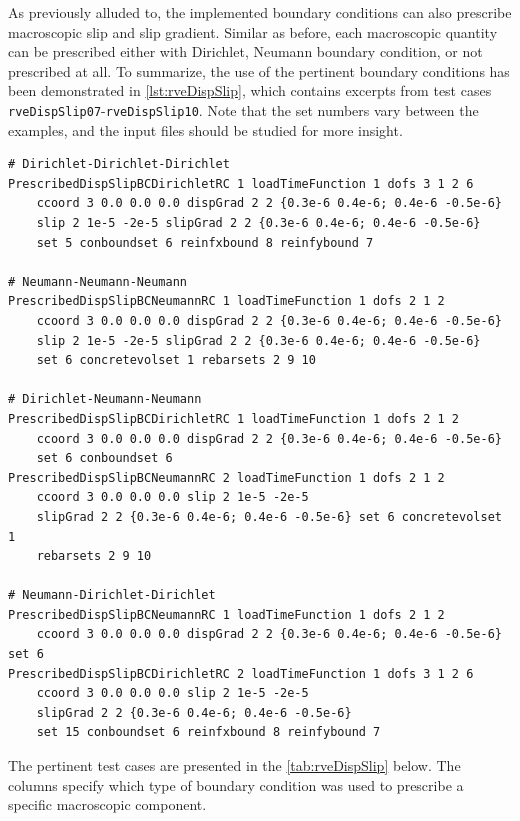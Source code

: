 \documentclass[11pt]{article}
\begin{document}
As previously alluded to, the implemented boundary conditions can also prescribe macroscopic slip and slip gradient. 
Similar as before, each macroscopic quantity can be prescribed either with Dirichlet, Neumann boundary condition, or not prescribed at all. 
To summarize, the use of the pertinent boundary conditions has been demonstrated in \cref{lst:rveDispSlip}, which contains excerpts from test cases \texttt{rveDispSlip07}-\texttt{rveDispSlip10}. Note that the set numbers vary between the examples, and the input files should be studied for more insight.

\begin{minipage}{\linewidth}
\begin{lstlisting}[style=oofem,language=oofeminput, caption={Use of boundary condition for prescribing macroscopic strain, slip and slip gradient.}, label=lst:rveDispSlip]
# Dirichlet-Dirichlet-Dirichlet
PrescribedDispSlipBCDirichletRC 1 loadTimeFunction 1 dofs 3 1 2 6 
    ccoord 3 0.0 0.0 0.0 dispGrad 2 2 {0.3e-6 0.4e-6; 0.4e-6 -0.5e-6} 
    slip 2 1e-5 -2e-5 slipGrad 2 2 {0.3e-6 0.4e-6; 0.4e-6 -0.5e-6} 
    set 5 conboundset 6 reinfxbound 8 reinfybound 7

# Neumann-Neumann-Neumann
PrescribedDispSlipBCNeumannRC 1 loadTimeFunction 1 dofs 2 1 2 
    ccoord 3 0.0 0.0 0.0 dispGrad 2 2 {0.3e-6 0.4e-6; 0.4e-6 -0.5e-6} 
    slip 2 1e-5 -2e-5 slipGrad 2 2 {0.3e-6 0.4e-6; 0.4e-6 -0.5e-6} 
    set 6 concretevolset 1 rebarsets 2 9 10

# Dirichlet-Neumann-Neumann
PrescribedDispSlipBCDirichletRC 1 loadTimeFunction 1 dofs 2 1 2 
    ccoord 3 0.0 0.0 0.0 dispGrad 2 2 {0.3e-6 0.4e-6; 0.4e-6 -0.5e-6} 
    set 6 conboundset 6
PrescribedDispSlipBCNeumannRC 2 loadTimeFunction 1 dofs 2 1 2 
    ccoord 3 0.0 0.0 0.0 slip 2 1e-5 -2e-5 
    slipGrad 2 2 {0.3e-6 0.4e-6; 0.4e-6 -0.5e-6} set 6 concretevolset 1 
    rebarsets 2 9 10

# Neumann-Dirichlet-Dirichlet
PrescribedDispSlipBCNeumannRC 1 loadTimeFunction 1 dofs 2 1 2 
    ccoord 3 0.0 0.0 0.0 dispGrad 2 2 {0.3e-6 0.4e-6; 0.4e-6 -0.5e-6} set 6 
PrescribedDispSlipBCDirichletRC 2 loadTimeFunction 1 dofs 3 1 2 6 
    ccoord 3 0.0 0.0 0.0 slip 2 1e-5 -2e-5 
    slipGrad 2 2 {0.3e-6 0.4e-6; 0.4e-6 -0.5e-6} 
    set 15 conboundset 6 reinfxbound 8 reinfybound 7

\end{lstlisting}
\end{minipage}
The pertinent test cases are presented in the \cref{tab:rveDispSlip} below. 
The columns specify which type of boundary condition was used to prescribe a specific macroscopic component.
\end{document}
